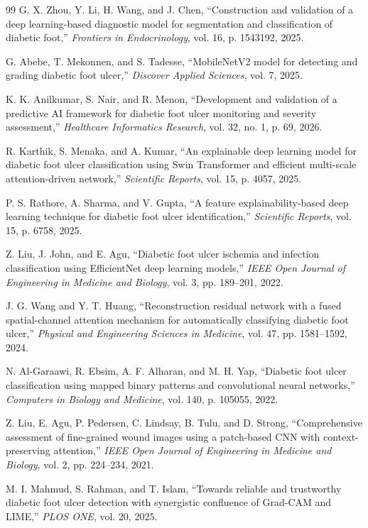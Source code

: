 \begin{thebibliography}{99}
G. X. Zhou, Y. Li, H. Wang, and J. Chen, ``Construction and validation of a
deep learning-based diagnostic model for segmentation and classification of
diabetic foot,'' \emph{Frontiers in Endocrinology}, vol. 16, p. 1543192,
2025.

G. Abebe, T. Mekonnen, and S. Tadesse, ``MobileNetV2 model for detecting
and grading diabetic foot ulcer,'' \emph{Discover Applied Sciences},
vol. 7, 2025.

K. K. Anilkumar, S. Nair, and R. Menon, ``Development and validation of a
predictive AI framework for diabetic foot ulcer monitoring and severity
assessment,'' \emph{Healthcare Informatics Research}, vol. 32, no. 1,
p. 69, 2026.

R. Karthik, S. Menaka, and A. Kumar, ``An explainable deep learning model
for diabetic foot ulcer classification using Swin Transformer and efficient
multi-scale attention-driven network,'' \emph{Scientific Reports}, vol. 15,
p. 4057, 2025.

P. S. Rathore, A. Sharma, and V. Gupta, ``A feature explainability-based
deep learning technique for diabetic foot ulcer identification,''
\emph{Scientific Reports}, vol. 15, p. 6758, 2025.

Z. Liu, J. John, and E. Agu, ``Diabetic foot ulcer ischemia and infection
classification using EfficientNet deep learning models,'' \emph{IEEE Open
Journal of Engineering in Medicine and Biology}, vol. 3, pp. 189--201, 2022.

J. G. Wang and Y. T. Huang, ``Reconstruction residual network with a fused
spatial-channel attention mechanism for automatically classifying diabetic
foot ulcer,'' \emph{Physical and Engineering Sciences in Medicine},
vol. 47, pp. 1581--1592, 2024.

N. Al-Garaawi, R. Ebsim, A. F. Alharan, and M. H. Yap, ``Diabetic foot
ulcer classification using mapped binary patterns and convolutional neural
networks,'' \emph{Computers in Biology and Medicine}, vol. 140, p. 105055,
2022.

Z. Liu, E. Agu, P. Pedersen, C. Lindsay, B. Tulu, and D. Strong,
``Comprehensive assessment of fine-grained wound images using a patch-based
CNN with context-preserving attention,'' \emph{IEEE Open Journal of
Engineering in Medicine and Biology}, vol. 2, pp. 224--234, 2021.

M. I. Mahmud, S. Rahman, and T. Islam, ``Towards reliable and trustworthy
diabetic foot ulcer detection with synergistic confluence of Grad-CAM and
LIME,'' \emph{PLOS ONE}, vol. 20, 2025.


\end{thebibliography}
